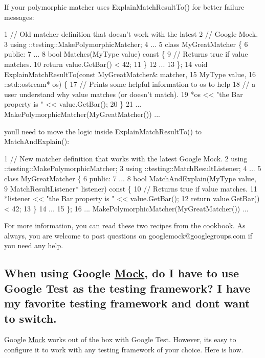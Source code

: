 If your polymorphic matcher uses {\ttfamily Explain\+Match\+Result\+To()} for better failure messages\+: 
\begin{DoxyCode}
1 // Old matcher definition that doesn't work with the latest
2 // Google Mock.
3 using ::testing::MakePolymorphicMatcher;
4 ...
5 class MyGreatMatcher \{
6  public:
7   ...
8   bool Matches(MyType value) const \{
9     // Returns true if value matches.
10     return value.GetBar() < 42;
11   \}
12   ...
13 \};
14 void ExplainMatchResultTo(const MyGreatMatcher& matcher,
15                           MyType value,
16                           ::std::ostream* os) \{
17   // Prints some helpful information to os to help
18   // a user understand why value matches (or doesn't match).
19   *os << "the Bar property is " << value.GetBar();
20 \}
21 ... MakePolymorphicMatcher(MyGreatMatcher()) ...
\end{DoxyCode}


you\textquotesingle{}ll need to move the logic inside {\ttfamily Explain\+Match\+Result\+To()} to {\ttfamily Match\+And\+Explain()}\+: 
\begin{DoxyCode}
1 // New matcher definition that works with the latest Google Mock.
2 using ::testing::MakePolymorphicMatcher;
3 using ::testing::MatchResultListener;
4 ...
5 class MyGreatMatcher \{
6  public:
7   ...
8   bool MatchAndExplain(MyType value,
9                        MatchResultListener* listener) const \{
10     // Returns true if value matches.
11     *listener << "the Bar property is " << value.GetBar();
12     return value.GetBar() < 42;
13   \}
14   ...
15 \};
16 ... MakePolymorphicMatcher(MyGreatMatcher()) ...
\end{DoxyCode}


For more information, you can read these two recipes from the cookbook. As always, you are welcome to post questions on {\ttfamily googlemock@googlegroups.\+com} if you need any help.

\subsection*{When using Google \hyperlink{class_mock}{Mock}, do I have to use Google Test as the testing framework? I have my favorite testing framework and don\textquotesingle{}t want to switch.}

Google \hyperlink{class_mock}{Mock} works out of the box with Google Test. However, it\textquotesingle{}s easy to configure it to work with any testing framework of your choice. Here is how.

